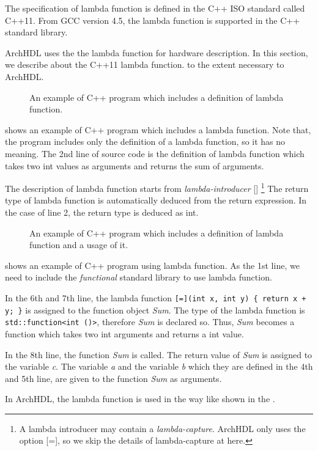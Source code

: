 The specification of lambda function is defined in the C++ ISO standard called C++11.
From GCC version 4.5, the lambda function is supported in the C++ standard library.

ArchHDL uses the the lambda function for hardware description.
In this section, we describe about the C++11 lambda function. to the extent necessary to ArchHDL.

\begin{figure}[t]
 
\caption{An example of C++ program which includes a definition of lambda function.}
 \label{src:def_lambda}
\end{figure}

 shows an example of C++ program which includes a lambda function.
Note that, the program includes only the definition of a lambda function, so it has no meaning.
The 2nd line of source code is the definition of lambda function which takes two int values as arguments and returns the sum of arguments.

The description of lambda function starts from \textit{lambda-introducer} [] \footnote{
A lambda introducer may contain a \textit{lambda-capture}.
ArchHDL only uses the option [=], so we skip the details of lambda-capture at here.
}
The return type of lambda function is automatically deduced from the return expression.
In the case of  line 2, the return type is deduced as int.

\begin{figure}[t]
 
 \caption{An example of C++ program which includes a definition of lambda function and a usage of it.}
 \label{src:ex_lambda}
\end{figure}

 shows an example of C++ program using lambda function.
As the 1st line, we need to include the \textit{functional} standard library to use lambda function.

In the 6th and 7th line, the lambda function \texttt{[=](int x, int y) \{ return x + y; \}} is assigned to the function object \textit{Sum}.
The type of the lambda function is \verb`std::function<int ()>`, therefore \textit{Sum} is declared so.
Thus, \textit{Sum} becomes a function which takes two int arguments and returns a int value.

In the 8th line, the function \textit{Sum} is called.
The return value of \textit{Sum} is assigned to the variable \textit{c}.
The variable \textit{a} and the variable \textit{b} which they are defined in the 4th and 5th line, are given to the function \textit{Sum} as arguments.

In ArchHDL, the lambda function is used in the way like shown in the .
